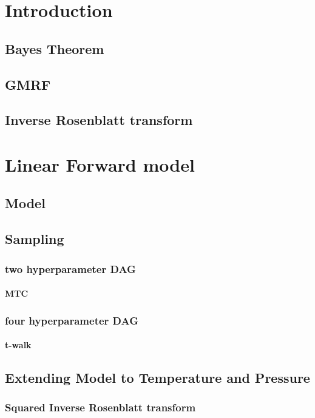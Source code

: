 \chapter{Introduction}
\section{Bayes Theorem}
\section{GMRF}
\section{Inverse Rosenblatt transform}

\chapter{Linear Forward model}

\section{Model}

\section{Sampling}
\subsection{two hyperparameter DAG}
\subsubsection{MTC}
\subsection{four hyperparameter DAG}

\subsubsection{t-walk}

\section{Extending Model to Temperature and Pressure}


\subsection{Squared Inverse Rosenblatt transform}


